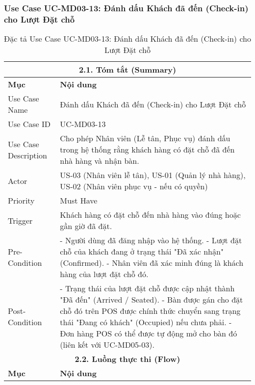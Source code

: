 \subsubsection{Use Case UC-MD03-13: Đánh dấu Khách đã đến (Check-in) cho Lượt Đặt chỗ}
\begin{longtable}{|m{4cm}|p{11cm}|}
\caption{Đặc tả Use Case UC-MD03-13: Đánh dấu Khách đã đến (Check-in) cho Lượt Đặt chỗ} \label{tab:uc_md03_13_revised_v3} \\
\hline
\multicolumn{2}{|c|}{\textbf{2.1. Tóm tắt (Summary)}} \\
\hline
\textbf{Mục} & \textbf{Nội dung} \\
\hline
\endhead %
\hline
\endfoot %
\hline
\endlastfoot %
Use Case Name & Đánh dấu Khách đã đến (Check-in) cho Lượt Đặt chỗ \\
\hline
Use Case ID & UC-MD03-13 \\
\hline
Use Case Description & Cho phép Nhân viên (Lễ tân, Phục vụ) đánh dấu trong hệ thống rằng khách hàng có đặt chỗ đã đến nhà hàng và nhận bàn. \\
\hline
Actor & US-03 (Nhân viên lễ tân), US-01 (Quản lý nhà hàng), US-02 (Nhân viên phục vụ - nếu có quyền) \\
\hline
Priority & Must Have \\
\hline
Trigger & Khách hàng có đặt chỗ đến nhà hàng vào đúng hoặc gần giờ đã đặt. \\
\hline
Pre-Condition & - Người dùng đã đăng nhập vào hệ thống. \newline - Lượt đặt chỗ của khách đang ở trạng thái "Đã xác nhận" (Confirmed). \newline - Nhân viên đã xác minh đúng là khách hàng của lượt đặt chỗ đó. \\
\hline
Post-Condition & - Trạng thái của lượt đặt chỗ được cập nhật thành "Đã đến" (Arrived / Seated). \newline - Bàn được gán cho đặt chỗ đó trên POS được chính thức chuyển sang trạng thái "Đang có khách" (Occupied) nếu chưa phải. \newline - Đơn hàng POS có thể được tự động mở cho bàn đó (liên kết với UC-MD05-03). \\
\hline
\multicolumn{2}{|c|}{\textbf{2.2. Luồng thực thi (Flow)}} \\
\hline
\textbf{Mục} & \textbf{Nội dung} \\
\hline

\end{longtable}
